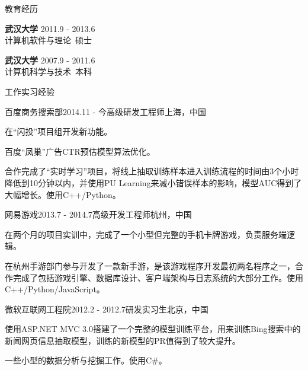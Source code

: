 \documentclass{resume} %
\begin{document}
\begin{rSection}{教育经历}

{\bf 武汉大学} \hfill {2011.9 - 2013.6} \\
计算机软件与理论\ 硕士

{\bf 武汉大学} \hfill {2007.9 - 2011.6} \\
计算机科学与技术\ 本科
\vspace{0.5em}

\end{rSection}

\begin{rSection}{工作实习经验}

\begin{rSubsection}{百度商务搜索部}{2014.11 - 今}{高级研发工程师}{上海，中国}
\item 在“闪投”项目组开发新功能。
\item 百度“凤巢”广告CTR预估模型算法优化。
\item 合作完成了“实时学习”项目，将线上抽取训练样本进入训练流程的时间由3个小时降低到10分钟以内，并使用PU Learning来减小错误样本的影响，模型AUC得到了大幅增长。使用C++/Python。
\end{rSubsection}
\begin{rSubsection}{网易游戏}{2013.7 - 2014.7}{高级开发工程师}{杭州，中国}
\item 在两个月的项目实训中，完成了一个小型但完整的手机卡牌游戏，负责服务端逻辑。
\item 在杭州手游部门参与开发了一款新手游，是该游戏程序开发最初两名程序之一，合作完成了包括游戏引擎、数据库设计、客户端架构与日志系统的大部分工作。使用C++/Python/JavaScript。
\end{rSubsection}
\begin{rSubsection}{微软互联网工程院}{2012.2 - 2012.7}{研发实习生}{北京，中国}
\item 使用ASP.NET MVC 3.0搭建了一个完整的模型训练平台，用来训练Bing搜索中的新闻网页信息抽取模型，训练的新模型的PR值得到了较大提升。
\item 一些小型的数据分析与挖掘工作。使用C\#。
\end{rSubsection}

\end{rSection}
\end{document}
